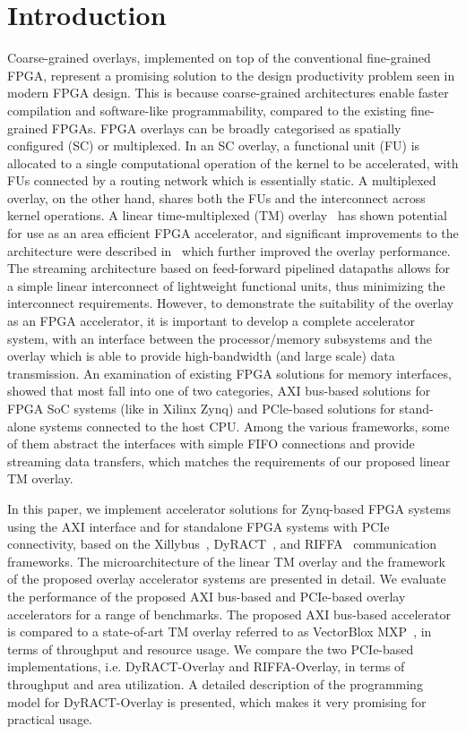 \section{Introduction}
Coarse-grained overlays, implemented on top of the conventional fine-grained FPGA, represent a promising solution to the design productivity problem seen in modern FPGA design. This is because coarse-grained architectures enable faster compilation and software-like programmability, compared to the existing fine-grained FPGAs.  
FPGA overlays can be broadly categorised as spatially configured (SC) or multiplexed. In an SC overlay, a functional unit (FU) is allocated to a single computational operation of the kernel to be accelerated, with FUs connected by a routing network which is essentially static. A multiplexed overlay, on the other hand, shares both the FUs and the interconnect across kernel operations.
A linear time-multiplexed (TM) overlay~\cite{li2016area} has shown potential for use as an area efficient FPGA accelerator, and significant improvements to the architecture were described in~\cite{li2018time} which further improved the overlay performance. 
The streaming architecture based on feed-forward pipelined datapaths allows for a simple linear interconnect of lightweight functional units, thus minimizing the interconnect requirements. 
However, to demonstrate the suitability of the overlay as an FPGA accelerator, it is important to develop a complete accelerator system, with an interface between the processor/memory subsystems and the overlay which is able to provide high-bandwidth (and large scale) data transmission.
An examination of existing FPGA solutions for memory interfaces, showed that most fall into one of two categories, AXI bus-based solutions for FPGA SoC systems (like in Xilinx Zynq) and PCle-based solutions for stand-alone systems connected to the host CPU. 
Among the various frameworks, some of them abstract the interfaces with simple FIFO connections and provide streaming data transfers, which matches the requirements of our proposed linear TM overlay. 

In this paper, we implement accelerator solutions for Zynq-based FPGA systems using the AXI interface and for standalone FPGA systems with PCIe connectivity, based on the Xillybus~\cite{xillybus2018}, DyRACT~\cite{vipin2014dyract}, and RIFFA~\cite{jacobsen2015riffa} communication frameworks. 
The microarchitecture of the linear TM overlay and the framework of the proposed overlay accelerator systems are presented in detail. 
We evaluate the performance of the proposed AXI bus-based and PCIe-based overlay accelerators for a range of benchmarks. 
The proposed AXI bus-based accelerator is compared to a state-of-art TM overlay referred to as VectorBlox MXP~\cite{severance2013embedded}, in terms of throughput and resource usage. 
We compare the two PCIe-based implementations, i.e. DyRACT-Overlay and RIFFA-Overlay, in terms of throughput and area utilization. 
A detailed description of the programming model for DyRACT-Overlay is presented, which makes it very promising for practical usage.


